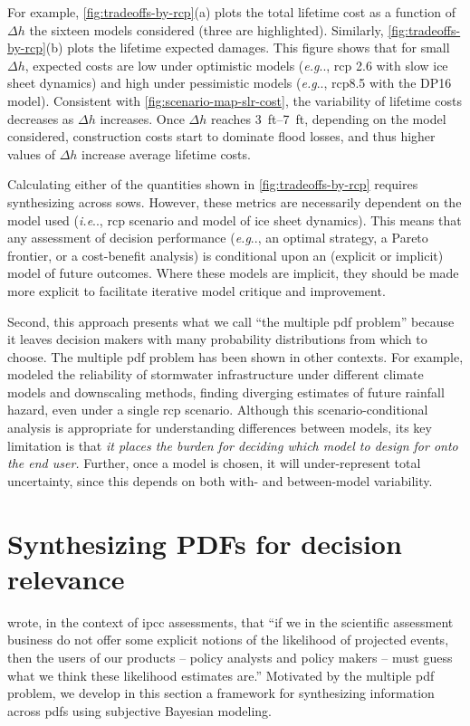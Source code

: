 \documentclass[12pt]{article}
\makeatletter
\DeclareRobustCommand\onedot{\futurelet\@let@token\@onedot}
\def\@onedot{\ifx\@let@token.\else.\null\fi\xspace}
\def\eg{\emph{e.g}\onedot} \def\Eg{\emph{E.g}\onedot}
\def\ie{\emph{i.e}\onedot} \def\Ie{\emph{I.e}\onedot}
\DeclareRobustCommand\onedot{\futurelet\@let@token\@onedot}
\def\@onedot{\ifx\@let@token.\else.\null\fi\xspace}
\def\eg{\emph{e.g}\onedot} \def\Eg{\emph{E.g}\onedot}
\def\ie{\emph{i.e}\onedot} \def\Ie{\emph{I.e}\onedot}
\makeatother
\begin{document}
For example, \cref{fig:tradeoffs-by-rcp}(a) plots the total lifetime cost as a function of $\Delta h$ the sixteen models considered (three are highlighted).
Similarly, \cref{fig:tradeoffs-by-rcp}(b) plots the lifetime expected damages.
This figure shows that for small $\Delta h$, expected costs are low under optimistic models (\eg, \gls{rcp} 2.6 with slow ice sheet dynamics) and high under pessimistic models (\eg, \gls{rcp}8.5 with the DP16 model).
Consistent with \cref{fig:scenario-map-slr-cost}, the variability of lifetime costs decreases as $\Delta h$ increases.
Once $\Delta h$ reaches \SIrange[]{3}{7}{ft}, depending on the model considered, construction costs start to dominate flood losses, and thus higher values of $\Delta h$ increase average lifetime costs.

Calculating either of the quantities shown in \cref{fig:tradeoffs-by-rcp} requires synthesizing across \glspl{sow}.
However, these metrics are necessarily dependent on the model used (\ie, \gls{rcp} scenario and model of ice sheet dynamics).
This means that any assessment of decision performance (\eg, an optimal strategy, a Pareto frontier, or a cost-benefit analysis) is conditional upon an (explicit or implicit) model of future outcomes.
Where these models are implicit, they should be made more explicit to facilitate iterative model critique and improvement.

Second, this approach presents what we call ``the multiple \gls{pdf} problem'' because it leaves decision makers with many probability distributions from which to choose.
The multiple \gls{pdf} problem has been shown in other contexts.
For example, \citet{sharma_rcp:2021} modeled the reliability of stormwater infrastructure under different climate models and downscaling methods, finding diverging estimates of future rainfall hazard, even under a single \gls{rcp} scenario.
Although this scenario-conditional analysis is appropriate for understanding differences between models, its key limitation is that \emph{it places the burden for deciding which model to design for onto the end user.}
Further, once a model is chosen, it will under-represent total uncertainty, since this depends on both with- and between-model variability.

\section{Synthesizing PDFs for decision relevance}\label{sec:synthesizing}

\citet{schneider_scenarios:2002} wrote, in the context of \gls{ipcc} assessments, that ``if we in the scientific assessment business do not offer some explicit notions of the likelihood of projected events, then the users of our products -- policy analysts and policy makers -- must guess what we think these likelihood estimates are.''
Motivated by the multiple \gls{pdf} problem, we develop in this section a framework for synthesizing information across \glspl{pdf} using subjective Bayesian modeling.
\end{document}
